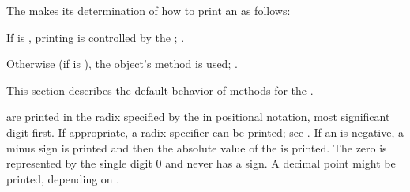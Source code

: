 
% 
% 
% 
% 
% 

The  makes its determination of how to print an
 as follows:

If  is , 
printing is controlled by the ;
\seesection\PPrintDispatchTables.

Otherwise (if  is ),
the object's  method is used;
\seesection\DefaultPrintObjMeths.

\endsubsection%


This section describes the default behavior of 
 methods for the  .



 are printed in the radix specified by the 
in positional notation, most significant digit first.
If appropriate, a radix specifier can be printed; see .
If an  is negative, a minus sign is printed and then the
absolute value of the  is printed.
The  zero is represented
by the single digit \f{0} and never has a sign.
A decimal point might be printed, 
depending on .

